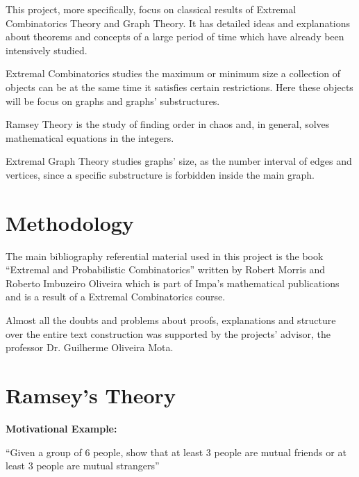 \documentclass[12pt,twoside,a4paper]{book}
\numberwithin{equation}{section}
\theoremstyle{remark}
\begin{document}
This project, more specifically, focus on classical results of Extremal Combinatorics Theory and Graph Theory. It has detailed ideas and explanations about theorems and concepts of a large period of time which have already been intensively studied.

Extremal Combinatorics studies the maximum or minimum size a collection of objects can be at the same time it satisfies certain restrictions. Here these objects will be focus on graphs and graphs' substructures. 

Ramsey Theory is the study of finding order in chaos and, in general, solves mathematical equations in the integers.

Extremal Graph Theory studies graphs' size, as the number interval of edges and vertices, since a specific substructure is forbidden inside the main graph.







\chapter{Methodology}
The main bibliography referential material used in this project is the book ``Extremal and Probabilistic Combinatorics'' written by Robert Morris and Roberto Imbuzeiro Oliveira which is part of Impa's mathematical publications and is a result of a Extremal Combinatorics course.

Almost all the doubts and problems about proofs, explanations and structure over the entire text construction was supported by the projects' advisor, the professor Dr. Guilherme Oliveira Mota.



\chapter{Ramsey's Theory}
{\bf Motivational Example:}

``Given a group of 6 people, show that at least 3 people are mutual friends or at least 3 people are mutual strangers''
\end{document}
